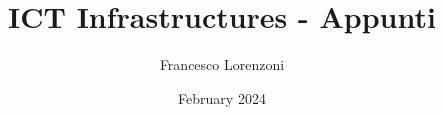 

\title{ICT Infrastructures - Appunti}
\author{Francesco Lorenzoni}
\date{February 2024}



\maketitle
\tableofcontents



















